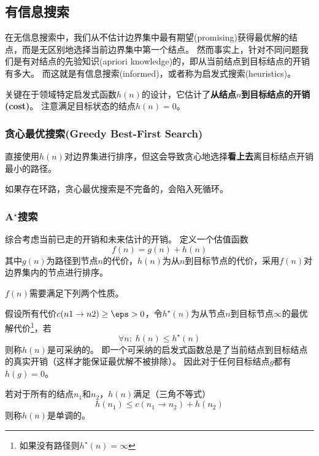 
\subsection{有信息搜索}

在无信息搜索中，我们从不估计边界集中最有期望(promising)获得最优解的结点，而是无区别地选择当前边界集中第一个结点。
然而事实上，针对不同问题我们是有对结点的先验知识(apriori knowledge)的，即从当前结点到目标结点的开销有多大。
而这就是有信息搜索(informed)，或者称为启发式搜索(heuristics)。

关键在于领域特定启发式函数$h(n)$的设计，它估计了\textbf{从结点$n$到目标结点的开销(cost)}。
注意满足目标状态的结点$h(n)=0$。

\subsubsection{贪心最优搜索(Greedy Best-First Search)}
直接使用$h(n)$对边界集进行排序，但这会导致贪心地选择\textbf{看上去}离目标结点开销最小的路径。

如果存在环路，贪心最优搜索是不完备的，会陷入死循环。
\begin{center}
\end{center}

\subsubsection{A$^\star$搜索}
综合考虑当前已走的开销和未来估计的开销。
定义一个估值函数
\[f(n)=g(n)+h(n)\]
其中$g(n)$为路径到节点$n$的代价，$h(n)$为从$n$到目标节点的代价，采用$f(n)$对边界集内的节点进行排序。

$f(n)$需要满足下列两个性质。
\begin{definition}
假设所有代价$c(n1\to n2)\geq\eps>0$，令$h^\star(n)$为从节点$n$到目标节点$\infty$的最优解代价\footnote{如果没有路径则$h^\star(n)=\infty$}，若
\[\forall n:\;h(n)\leq h^\star(n)\]
则称$h(n)$是可采纳的。
即一个可采纳的启发式函数总是了当前结点到目标结点的真实开销（这样才能保证最优解不被排除）。
因此对于任何目标结点$g$都有$h(g)=0$。
\end{definition}
\begin{definition}
若对于所有的结点$n_1$和$n_2$，$h(n)$满足（三角不等式）
\[h(n_1)\leq c(n_1\to n_2)+h(n_2)\]
则称$h(n)$是单调的。
\end{definition}

